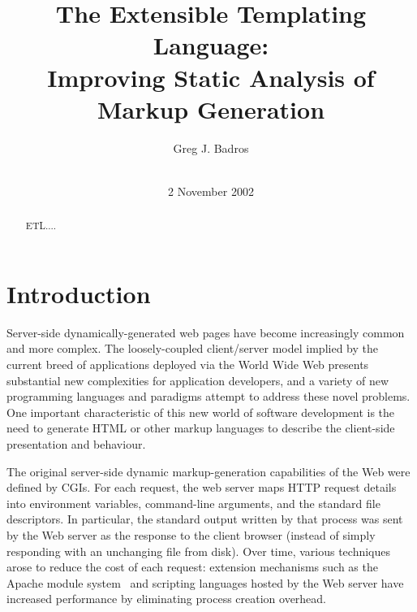 \documentclass{www2003-submission}
\newcommand{\B}{\discretionary{}{}{}}
\begin{document}
%
\title{The Extensible Templating Language: \\
       Improving Static Analysis of Markup Generation}


\author{
%
\alignauthor Greg J. Badros\\
       \\
}
\date{2 November 2002}
\maketitle
\begin{abstract}
ETL....
\end{abstract}




\section{Introduction}

Server-side dynamically-generated web pages have become increasingly
common and more complex.  The loosely-coupled client/\B{}server model
implied by the current breed of applications deployed via the World
Wide Web presents substantial new complexities for application
developers, and a variety of new programming languages and paradigms
attempt to address these novel problems.  One important characteristic
of this new world of software development is the need to generate HTML
or other markup languages to describe the client-side presentation and
behaviour.

The original server-side dynamic markup-generation capabilities of the
Web were defined by CGIs.\cite{CGI} For each request, the web server
maps HTTP request details into environment variables, command-line
arguments, and the standard file descriptors.  In particular, the
standard output written by that process was sent by the Web server as
the response to the client browser (instead of simply responding with
an unchanging file from disk).  Over time, various techniques arose to
reduce the cost of each request: extension mechanisms such as the
Apache module system~\cite{ApacheModules} and scripting languages
hosted by the Web server have increased performance by eliminating
process creation overhead.
\end{document}
